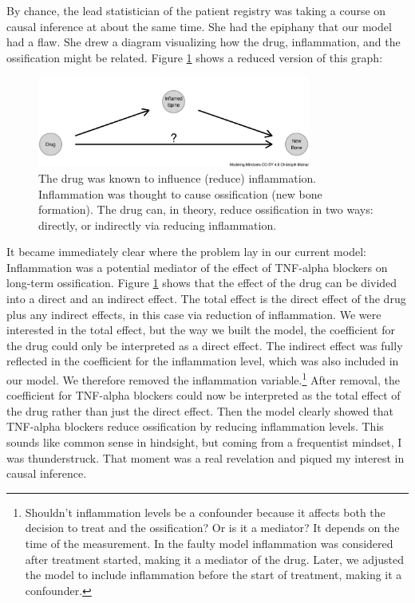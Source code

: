 \documentclass[
  10pt,
]{scrbook}
\begin{document}
By chance, the lead statistician of the patient registry was taking a course on causal inference at about the same time.
She had the epiphany that our model had a flaw.
She drew a diagram visualizing how the drug, inflammation, and the ossification might be related.
Figure \ref{fig:tnfdag} shows a reduced version of this graph:

\begin{figure}

{\centering \includegraphics[width=0.8\textwidth]{figures/tnfdag-1} 

}

\caption{The drug was known to influence (reduce) inflammation. Inflammation was thought to cause ossification (new bone formation). The drug can, in theory, reduce ossification in two ways: directly, or indirectly via reducing inflammation.}\label{fig:tnfdag}
\end{figure}

It became immediately clear where the problem lay in our current model:
Inflammation was a potential mediator of the effect of TNF-alpha blockers on long-term ossification.
Figure \ref{fig:tnfdag} shows that the effect of the drug can be divided into a direct and an indirect effect.
The total effect is the direct effect of the drug plus any indirect effects, in this case via reduction of inflammation.
We were interested in the total effect, but the way we built the model, the coefficient for the drug could only be interpreted as a direct effect.
The indirect effect was fully reflected in the coefficient for the inflammation level, which was also included in our model.
We therefore removed the inflammation variable.\footnote{Shouldn't inflammation levels be a confounder because it affects both the decision to treat and the ossification? Or is it a mediator? It depends on the time of the measurement. In the faulty model inflammation was considered after treatment started, making it a mediator of the drug. Later, we adjusted the model to include inflammation before the start of treatment, making it a confounder.}
After removal, the coefficient for TNF-alpha blockers could now be interpreted as the total effect of the drug rather than just the direct effect.
Then the model clearly showed that TNF-alpha blockers reduce ossification by reducing inflammation levels.
This sounds like common sense in hindsight, but coming from a frequentist mindset, I was thunderstruck.
That moment was a real revelation and piqued my interest in causal inference.
\end{document}
